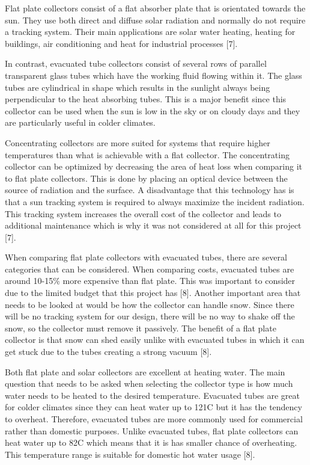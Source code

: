 \medskip
Flat plate collectors consist of a flat absorber plate that is orientated towards the sun. They use both direct and diffuse solar radiation and normally do not require a tracking system. Their main applications are solar water heating, heating for buildings, air conditioning and heat for industrial processes [7].

\medskip
In contrast, evacuated tube collectors consist of several rows of parallel transparent glass tubes which have the working fluid flowing within it. The glass tubes are cylindrical in shape which results in the sunlight always being perpendicular to the heat absorbing tubes. This is a major benefit since this collector can be used when the sun is low in the sky or on cloudy days and they are particularly useful in colder climates.

\medskip
Concentrating collectors are more suited for systems that require higher temperatures than what is achievable with a flat collector. The concentrating collector can be optimized by decreasing the area of heat loss when comparing it to flat plate collectors. This is done by placing an optical device between the source of radiation and the surface. A disadvantage that this technology has is that a sun tracking system is required to always maximize the incident radiation. This tracking system increases the overall cost of the collector and leads to additional maintenance which is why it was not considered at all for this project [7].

\medskip
When comparing flat plate collectors with evacuated tubes, there are several categories that can be considered. When comparing costs, evacuated tubes are around 10-15\% more expensive than flat plate. This was important to consider due to the limited budget that this project has [8]. Another important area that needs to be looked at would be how the collector can handle snow. Since there will be no tracking system for our design, there will be no way to shake off the snow, so the collector must remove it passively. The benefit of a flat plate collector is that snow can shed easily unlike with evacuated tubes in which it can get stuck due to the tubes creating a strong vacuum [8].

\medskip
Both flat plate and solar collectors are excellent at heating water. The main question that needs to be asked when selecting the collector type is how much water needs to be heated to the desired temperature. Evacuated tubes are great for colder climates since they can heat water up to 121\textdegree C but it has the tendency to overheat. Therefore, evacuated tubes are more commonly used for commercial rather than domestic purposes. Unlike evacuated tubes, flat plate collectors can heat water up to 82\textdegree C which means that it is has smaller chance of overheating. This temperature range is suitable for domestic hot water usage [8].

